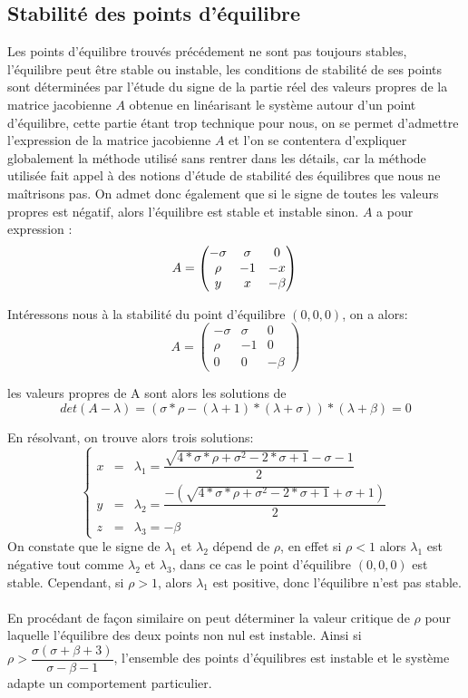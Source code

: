 \subsection{Stabilité des points d'équilibre}
Les points d'équilibre trouvés précédement ne sont pas toujours stables, l'équilibre peut être stable ou instable, les conditions de stabilité de ses points sont déterminées par l'étude du signe de la partie réel des valeurs propres de la matrice jacobienne $A$ obtenue en linéarisant le système autour d'un point d'équilibre, cette partie étant trop technique pour nous, on se permet d'admettre l'expression de la matrice jacobienne $A$ et l'on se contentera d'expliquer globalement la méthode utilisé sans rentrer dans les détails, car la méthode utilisée fait appel à des notions d'étude de stabilité des équilibres que nous ne maîtrisons pas. On admet donc également que si le signe de toutes les valeurs propres est négatif, alors l'équilibre est stable et instable sinon.
$A$ a pour expression :
$$A=\begin{pmatrix}
    -\sigma & \sigma & 0\\
    \rho & -1 & -x\\
       y & x & -\beta 
\end{pmatrix}\\\\$$

Intéressons nous à la stabilité du point d'équilibre $(0,0,0)$, on a alors:
$$A=\begin{pmatrix}
    -\sigma & \sigma & 0\\
    \rho & -1 & 0\\
       0 & 0 & -\beta 
\end{pmatrix}$$

les valeurs propres de A sont alors les solutions de
$$det(A-\lambda)=(\sigma*\rho-(\lambda+1)*(\lambda+\sigma))*(\lambda+\beta)=0$$

En résolvant, on trouve alors trois solutions: 
\[
    \left\{
    \begin{array}{rcl}
        x&=& \lambda_{1}=\dfrac{\sqrt{4*\sigma*\rho+\sigma^2-2*\sigma+1}-\sigma-1}{2}\\[12pt]
        y&=& \lambda_{2}=\dfrac{-(\sqrt{4*\sigma*\rho+\sigma^2-2*\sigma+1}+\sigma+1)}{2}\\[12pt]
        z&=& \lambda_{3}=-\beta
    \end{array}
    \right.
\]
On constate que le signe de  $\lambda_{1}$ et $\lambda_{2}$ dépend de $\rho$, en effet si $\rho<1$ alors $\lambda_{1}$ est négative tout comme $\lambda_{2}$ et $\lambda_{3}$, dans ce cas le point d'équilibre $(0,0,0)$ est stable. Cependant, si $\rho>1$, alors $\lambda_{1}$ est positive, donc l'équilibre n'est pas stable.\\\\
En procédant de façon similaire on peut déterminer la valeur critique de $\rho$ pour laquelle l'équilibre des deux points non nul est instable. Ainsi si $\rho > \dfrac{\sigma(\sigma+\beta+3)}{\sigma-\beta-1}$, l'ensemble des points d'équilibres est instable et le système adapte un comportement particulier.

